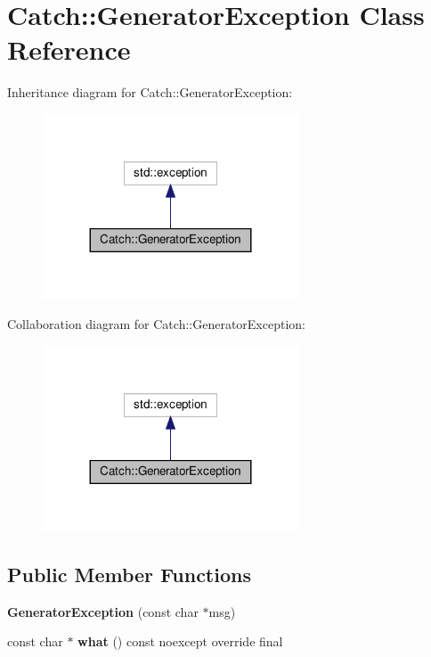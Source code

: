 \hypertarget{classCatch_1_1GeneratorException}{}\section{Catch\+:\+:Generator\+Exception Class Reference}
\label{classCatch_1_1GeneratorException}


Inheritance diagram for Catch\+:\+:Generator\+Exception\+:
\nopagebreak
\begin{figure}[H]
\begin{center}
\leavevmode
\includegraphics[width=215pt]{classCatch_1_1GeneratorException__inherit__graph}
\end{center}
\end{figure}


Collaboration diagram for Catch\+:\+:Generator\+Exception\+:
\nopagebreak
\begin{figure}[H]
\begin{center}
\leavevmode
\includegraphics[width=215pt]{classCatch_1_1GeneratorException__coll__graph}
\end{center}
\end{figure}
\subsection*{Public Member Functions}
\begin{DoxyCompactItemize}
\item 
\mbox{\label{classCatch_1_1GeneratorException_a3cf9282d555ec32389665ce723bf36ea}} 
{\bfseries Generator\+Exception} (const char $\ast$msg)
\item 
\mbox{\label{classCatch_1_1GeneratorException_ade029163144d136f12187e5b9a0161d5}} 
const char $\ast$ {\bfseries what} () const noexcept override final
\end{DoxyCompactItemize}
